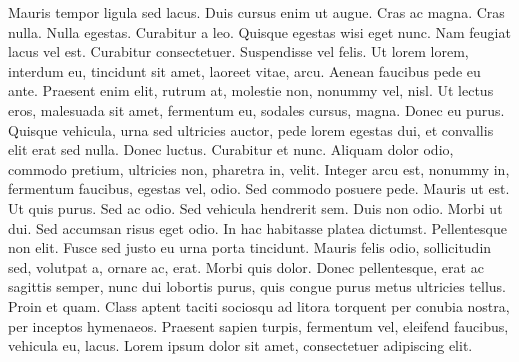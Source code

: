 \documentclass[draft,12pt,twoside,a4paper]{book}
\begin{document}
Mauris tempor ligula sed lacus.
Duis cursus enim ut augue.
Cras ac magna.
Cras nulla.
Nulla egestas.
Curabitur a leo.
Quisque egestas wisi eget nunc.
Nam feugiat lacus vel est.
Curabitur consectetuer.
Suspendisse vel felis.
Ut lorem lorem, interdum eu, tincidunt sit amet, laoreet vitae, arcu.
Aenean faucibus pede eu ante.
Praesent enim elit, rutrum at, molestie non, nonummy vel, nisl.
Ut lectus eros, malesuada sit amet, fermentum eu, sodales cursus, magna.
Donec eu purus.
Quisque vehicula, urna sed ultricies auctor, pede lorem egestas dui,
 et convallis elit erat sed nulla.
Donec luctus.
Curabitur et nunc.
Aliquam dolor odio, commodo pretium, ultricies non, pharetra in, velit.
Integer arcu est, nonummy in, fermentum faucibus, egestas vel, odio.
Sed commodo posuere pede.
Mauris ut est.
Ut quis purus.
Sed ac odio.
Sed vehicula hendrerit sem.
Duis non odio.
Morbi ut dui.
Sed accumsan risus eget odio.
In hac habitasse platea dictumst.
Pellentesque non elit.
Fusce sed justo eu urna porta tincidunt.
Mauris felis odio, sollicitudin sed, volutpat a, ornare ac, erat.
Morbi quis dolor.
Donec pellentesque, erat ac sagittis semper, nunc dui lobortis purus,
 quis congue purus metus ultricies tellus.
Proin et quam.
Class aptent taciti sociosqu ad litora torquent per conubia nostra,
 per inceptos hymenaeos.
Praesent sapien turpis, fermentum vel, eleifend faucibus, vehicula eu, lacus.
Lorem ipsum dolor sit amet, consectetuer adipiscing elit.
\end{document}
